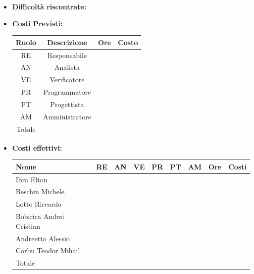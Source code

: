 \begin{itemize}
\begin{itemize}
            \end{itemize}
            \item \textbf{Difficoltà riscontrate:}
            \item \textbf{Costi Previsti:}
            \begin{longtable}{|c|c|c|c|}
                \hline
                Ruolo & Descrizione & Ore & Costo \\
                \hline
                RE & Responsabile &  &  \\
                \hline
                AN & Analista &  &  \\
                \hline
                VE & Verificatore &  &  \\
                \hline
                PR & Programmatore &  &  \\
                \hline
                PT & Progettista &  &  \\
                \hline
                AM & Amministratore &  &  \\
                \hline
                Totale & &  &  \\
                \hline
                \end{longtable}
            \item \textbf{Costi effettivi:}
            \begin{longtable}{|p{}|c|c|c|c|c|c|c|c|}
                \hline
                Nome & RE & AN & VE & PR & PT & AM & Ore & Costi\\
                \hline
                Ibra \newline Elton & & & & & & & & \\
                \hline
                Beschin Michele & & & & & & & & \\
                \hline
                Lotto \newline Riccardo & & & & & & & & \\
                \hline
                Bobirica Andrei Cristian & & & & & & & & \\
                \hline
                Andreetto Alessio & & & & & & & & \\
                \hline
                Corbu Teodor Mihail & & & & & & & & \\
                \hline
                Totale & & & & & & & & \\
                \hline
            \end{longtable}
            \end{itemize}


